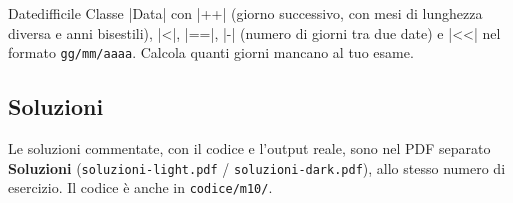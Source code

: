 \begin{esercizio}{Date}{difficile}
Classe \cc|Data| con \cc|++| (giorno successivo, con mesi di lunghezza diversa e anni
bisestili), \cc|<|, \cc|==|, \cc|-| (numero di giorni tra due date) e \cc|<<| nel formato
\texttt{gg/mm/aaaa}. Calcola quanti giorni mancano al tuo esame.
\end{esercizio}

\subsection*{Soluzioni}
Le soluzioni commentate, con il codice e l'output reale, sono nel PDF separato
\textbf{Soluzioni} (\texttt{soluzioni-light.pdf} / \texttt{soluzioni-dark.pdf}),
allo stesso numero di esercizio. Il codice è anche in \texttt{codice/m10/}.
